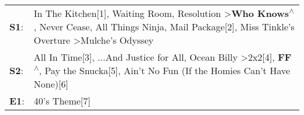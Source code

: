 \begin{supertabular}{p{0.03\textwidth}p{0.92\textwidth}}
 \textbf{S1}:  &  In The Kitchen[1]\textsuperscript{}, \enspace Waiting Room\textsuperscript{}, \enspace Resolution\textsuperscript{} \textgreater \enspace \textbf{Who Knows\textsuperscript{$\wedge$}}, \enspace Never Cease\textsuperscript{}, \enspace All Things Ninja\textsuperscript{}, \enspace Mail Package[2]\textsuperscript{}, \enspace Miss Tinkle's Overture\textsuperscript{} \textgreater \enspace Mulche's Odyssey\textsuperscript{}  \enspace  \\
 \textbf{S2}:  &                                                                                 All In Time[3]\textsuperscript{}, \enspace ...And Justice for All\textsuperscript{}, \enspace Ocean Billy\textsuperscript{} \textgreater \enspace 2x2[4]\textsuperscript{}, \enspace \textbf{FF\textsuperscript{$\wedge$}}, \enspace Pay the Snucka[5]\textsuperscript{}, \enspace Ain't No Fun (If the Homies Can't Have None)[6]\textsuperscript{}  \enspace  \\
 \textbf{E1}:  &                                                                                                                                                                                                                                                                                                                                                                                                      40's Theme[7]\textsuperscript{}  \enspace  \\
\end{supertabular}
